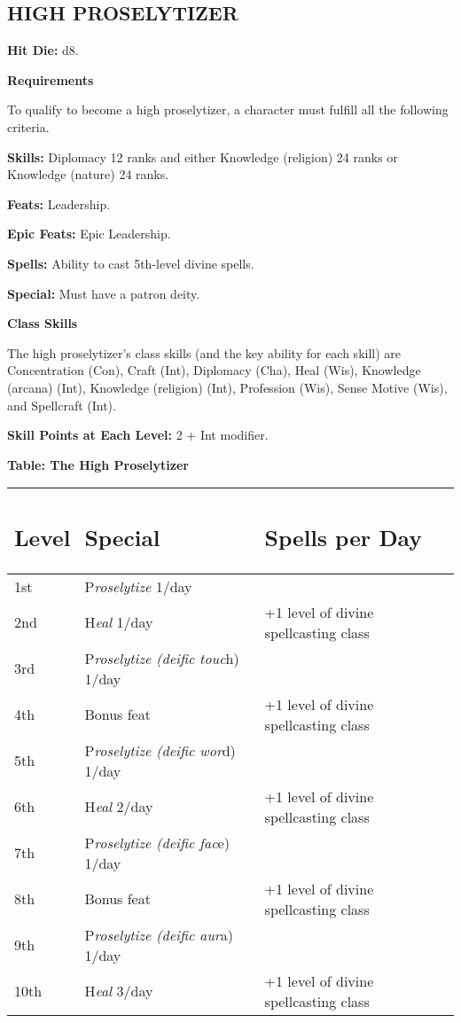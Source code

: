 \documentclass{article}
\begin{document}
\subsection*{{\LARGE{}HIGH PROSELYTIZER }}

\textbf{Hit Die:} d8.

\textbf{Requirements}

To qualify to become a high proselytizer, a character must fulfill all the following 
criteria. 

\textbf{Skills:} Diplomacy 12 ranks and either Knowledge (religion) 24 ranks or 
Knowledge (nature) 24 ranks.

\textbf{Feats:} Leadership. 

\textbf{Epic Feats:} Epic Leadership. 

\textbf{Spells:} Ability to cast 5th-level divine spells. 

\textbf{Special:} Must have a patron deity. 

\textbf{Class Skills}

The high proselytizer's class skills (and the key ability for each skill) are Concentration 
(Con), Craft (Int), Diplomacy (Cha), Heal (Wis), Knowledge (arcana) (Int), Knowledge 
(religion) (Int), Profession (Wis), Sense Motive (Wis), and Spellcraft (Int). 

\textbf{Skill Points at Each Level:} 2 + Int modifier.  

\vspace{12pt}
\textbf{Table: The High Proselytizer }

\begin{tabular}{|>{\raggedright}p{27pt}|>{\raggedright}p{131pt}|>{\raggedright}p{148pt}|}
\hline
\subsection*{L\textbf{evel}} & \subsection*{S\textbf{pecial}} & \subsection*{S\textbf{pells 
per Day }}\tabularnewline
\hline
1st & P\textit{roselytize }1/day  & \tabularnewline
\hline
2nd & H\textit{eal }1/day & +1 level of divine spellcasting class \tabularnewline
\hline
3rd & P\textit{roselytize (deific touc}h) 1/day  & \tabularnewline
\hline
4th & Bonus feat & +1 level of divine spellcasting class \tabularnewline
\hline
5th & P\textit{roselytize (deific wor}d) 1/day  & \tabularnewline
\hline
6th & H\textit{eal }2/day & +1 level of divine spellcasting class \tabularnewline
\hline
7th & P\textit{roselytize (deific fac}e) 1/day  & \tabularnewline
\hline
8th & Bonus feat & +1 level of divine spellcasting class \tabularnewline
\hline
9th & P\textit{roselytize (deific aur}a) 1/day  & \tabularnewline
\hline
10th & H\textit{eal }3/day & +1 level of divine spellcasting class \tabularnewline
\hline
\end{tabular}
\end{document}
